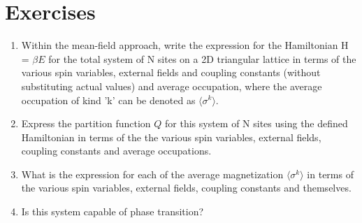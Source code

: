 \documentclass[book.tex]{subfiles}
\begin{document}
\section{Exercises}

\begin{enumerate}
\item Within the mean-field approach, write the expression for the Hamiltonian H = $\beta E$ for the total system of N sites on a 2D triangular lattice in terms of the various spin variables, external fields and coupling constants (without substituting actual values) and average occupation, where the average occupation of kind 'k' can be denoted as $\langle \sigma^{k}\rangle $. 
\item Express the partition function $Q$ for this system of N sites using the defined Hamiltonian in terms of the the various spin variables, external fields, coupling constants and average occupations. 
\item What is the expression for each of the average magnetization $\langle \sigma^{k}\rangle $ in terms of the various spin variables, external fields, coupling constants and themselves. 
\item Is this system capable of phase transition?
\end{enumerate}
\end{document}
